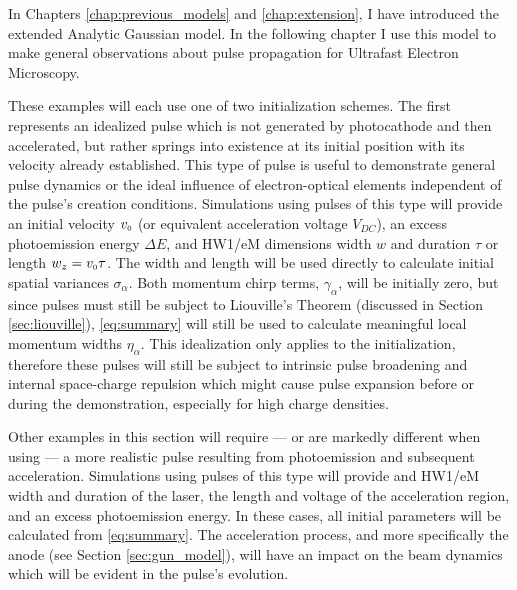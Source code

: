 
In Chapters \ref{chap:previous_models} and \ref{chap:extension}, I have introduced the extended Analytic Gaussian model.
In the following chapter I use this model to make general observations about pulse propagation for Ultrafast Electron Microscopy.

These examples will each use one of two initialization schemes.
The first represents an idealized pulse which is not generated by photocathode and then accelerated, but rather springs into existence at its initial position with its velocity already established.
This type of pulse is useful to demonstrate general pulse dynamics or the ideal influence of electron-optical elements independent of the pulse's creation conditions.
Simulations using pulses of this type will provide an initial velocity $v_{{\scriptscriptstyle 0}}$ (or equivalent acceleration voltage $V_{DC}$), an excess photoemission energy $\Delta E$, and HW1/eM dimensions width $w$ and duration $\tau$ or length $ w_z = v_{{\scriptscriptstyle 0}} \tau$.
The width and length will be used directly to calculate initial spatial variances $\sigma_{\alpha}$.
Both momentum chirp terms, $\gamma_{\alpha}$, will be initially zero, but since pulses must still be subject to Liouville's Theorem (discussed in Section \ref{sec:liouville}), \ref{eq:summary} will still be used to calculate meaningful local momentum widths $\eta_{\alpha}$.
This idealization only applies to the initialization, therefore these pulses will still be subject to intrinsic pulse broadening and internal space-charge repulsion which might cause pulse expansion before or during the demonstration, especially for high charge densities.

Other examples in this section will require --- or are markedly different when using --- a more realistic pulse resulting from photoemission and subsequent acceleration.
Simulations using pulses of this type will provide and HW1/eM width and duration of the laser, the length and voltage of the acceleration region, and an excess photoemission energy.
In these cases, all initial parameters will be calculated from \ref{eq:summary}.
The acceleration process, and more specifically the anode (see Section \ref{sec:gun_model}), will have an impact on the beam dynamics which will be evident in the pulse's evolution.

